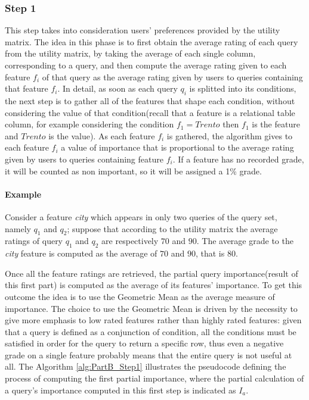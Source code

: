 \subsubsection{Step 1}

This step takes into consideration users' preferences provided by the utility matrix. The idea in this phase is to first obtain the average rating of each query from the utility matrix, by taking the average of each single column, corresponding to a query, and then compute the average rating given to each feature $f_i$ of that query as the average rating given by users to queries containing that feature $f_i$. In detail, as soon as each query $q_i$ is splitted into its conditions, the next step is to gather all of the features that shape each condition, without considering the value of that condition(recall that a feature is a relational table column, for example considering the condition $f_1 = Trento $ then $f_1$ is the feature and $Trento$ is the value). As each feature  $f_i$ is gathered, the algorithm gives to each feature $f_i$ a value of importance that is proportional to the average rating given by users to queries containing feature $f_i$. If a feature has no recorded grade, it will be counted as non important, so it will be assigned a 1\% grade. 

\paragraph{Example} Consider a feature \emph{city} which appears in only two queries of the query set, namely $q_1$ and $q_2$; suppose that according to the utility matrix the average ratings of query $q_1$ and $q_2$ are respectively $70$ and $90$. The average grade to the \emph{city} feature is computed as the average of $70$ and $90$, that is $80$.


\vspace{1em}
Once all the feature ratings are retrieved, the partial query importance(result of this first part) is computed as the average of its features' importance. To get this outcome the idea is to use the Geometric Mean\cite{geometric_mean} as the average measure of importance. The choice to use the Geometric Mean is driven by the necessity to give more emphasis to low rated features rather than highly rated features: given that a query is defined as a conjunction of condition, all the conditions must be satisfied in order for the query to return a specific row, thus even a negative grade on a single feature probably means that the entire query is not useful at all. 
The Algorithm \ref{alg:PartB_Step1} illustrates the pseudocode defining the process of computing the first partial importance, where the partial calculation of a query's importance computed in this first step is indicated as $I_a$. 

